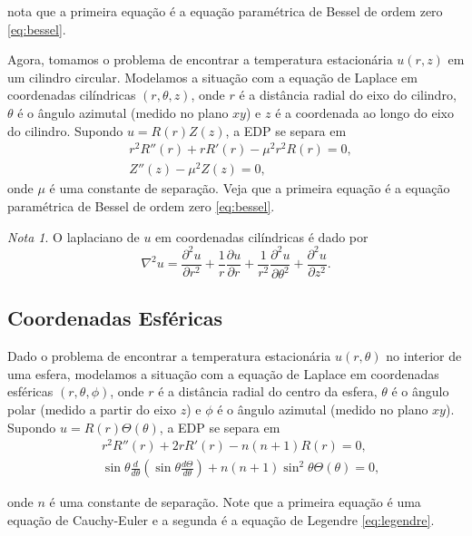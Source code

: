 \documentclass{article}
\theoremstyle{plain}
\theoremstyle{definition}
\theoremstyle{remark}
\newtheorem*{rem}{Nota}
\begin{document}
\noindent nota que a primeira equação é a equação paramétrica de Bessel de ordem zero \eqref{eq:bessel}.

Agora, tomamos o problema de encontrar a temperatura estacionária \(u(r,z)\) em um cilindro circular. Modelamos a situação com a equação de Laplace em coordenadas cilíndricas \((r, \theta, z)\), onde \(r\) é a distância radial do eixo do cilindro, \(\theta\) é o ângulo azimutal (medido no plano \(xy\)) e \(z\) é a coordenada ao longo do eixo do cilindro. Supondo \(u = R(r)Z(z)\), a EDP se separa em 
    \begin{align}
        &r^2 R''(r) + r R'(r) - \mu^2 r^2 R(r) = 0, \\
        &Z''(z) - \mu^2 Z(z) = 0,
    \end{align}
\noindent onde \(\mu\) é uma constante de separação. Veja que a primeira equação é a equação paramétrica de Bessel de ordem zero \eqref{eq:bessel}.

\begin{rem}
    O laplaciano de \(u\) em coordenadas cilíndricas é dado por
    \begin{equation}
        \nabla^2 u = \frac{\partial^2 u}{\partial r^2} + \frac{1}{r} \frac{\partial u}{\partial r} + \frac{1}{r^2} \frac{\partial^2 u}{\partial \theta^2} + \frac{\partial^2 u}{\partial z^2}.
    \end{equation}
\end{rem}

\subsection{Coordenadas Esféricas}

Dado o problema de encontrar a temperatura estacionária \(u(r, \theta)\) no interior de uma esfera, modelamos a situação com a equação de Laplace em coordenadas esféricas \((r, \theta, \phi)\), onde \(r\) é a distância radial do centro da esfera, \(\theta\) é o ângulo polar (medido a partir do eixo \(z\)) e \(\phi\) é o ângulo azimutal (medido no plano \(xy\)). Supondo \(u = R(r)\Theta(\theta)\), a EDP se separa em 
    \begin{align}
        &r^2 R''(r) + 2r R'(r) - n(n+1) R(r) = 0, \\
        &\sin\theta \frac{d}{d\theta}\left(\sin\theta \frac{d\Theta}{d\theta}\right) + n(n+1) \sin^2\theta \Theta(\theta) = 0,
    \end{align}

\noindent onde \(n\) é uma constante de separação. Note que a primeira equação é uma equação de Cauchy-Euler e a segunda é a equação de Legendre \eqref{eq:legendre}.
\end{document}
